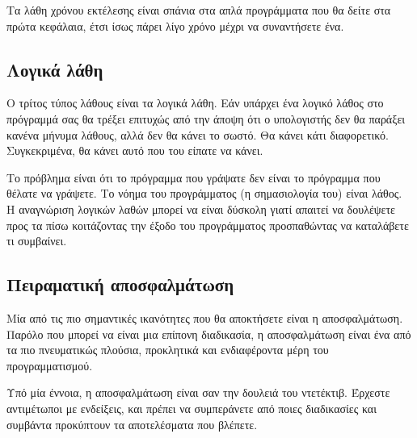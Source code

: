 \documentclass[10pt]{book}
\begin{document}
Τα λάθη χρόνου εκτέλεσης είναι σπάνια στα απλά προγράμματα που θα δείτε
στα πρώτα κεφάλαια, έτσι ίσως πάρει λίγο χρόνο μέχρι να συναντήσετε ένα.

\subsection{Λογικά λάθη}

Ο τρίτος τύπος λάθους είναι τα λογικά λάθη. Εάν υπάρχει ένα λογικό
λάθος στο πρόγραμμά σας θα τρέξει επιτυχώς από την άποψη ότι ο υπολογιστής
δεν θα παράξει κανένα μήνυμα λάθους, αλλά δεν θα κάνει το σωστό. Θα
κάνει κάτι διαφορετικό. Συγκεκριμένα, θα κάνει αυτό που του είπατε να
κάνει.

Το πρόβλημα είναι ότι το πρόγραμμα που γράψατε δεν είναι το πρόγραμμα
που θέλατε να γράψετε. Το νόημα του προγράμματος (η σημασιολογία του)
είναι λάθος. Η αναγνώριση λογικών λαθών μπορεί να είναι δύσκολη γιατί
απαιτεί να δουλέψετε προς τα πίσω κοιτάζοντας την έξοδο του προγράμματος
προσπαθώντας να καταλάβετε τι συμβαίνει.

\subsection{Πειραματική αποσφαλμάτωση}

Μία από τις πιο σημαντικές ικανότητες που θα αποκτήσετε είναι
η αποσφαλμάτωση. Παρόλο που μπορεί να είναι μια επίπονη διαδικασία,
η αποσφαλμάτωση είναι ένα από τα πιο πνευματικώς πλούσια, προκλητικά
και ενδιαφέροντα μέρη του προγραμματισμού.


Υπό μία έννοια, η αποσφαλμάτωση είναι σαν την δουλειά του ντετέκτιβ.
Έρχεστε αντιμέτωποι με ενδείξεις, και πρέπει να συμπεράνετε από ποιες
διαδικασίες και συμβάντα προκύπτουν τα αποτελέσματα που βλέπετε.
\end{document}
